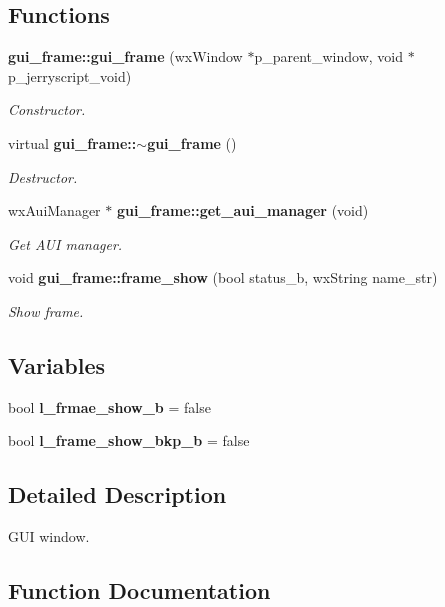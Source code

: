 \subsection*{Functions}
\begin{DoxyCompactItemize}
\item 
\textbf{ gui\+\_\+frame\+::gui\+\_\+frame} (wx\+Window $\ast$p\+\_\+parent\+\_\+window, void $\ast$p\+\_\+jerryscript\+\_\+void)
\begin{DoxyCompactList}\small\item\em Constructor. \end{DoxyCompactList}\item 
virtual \textbf{ gui\+\_\+frame\+::$\sim$gui\+\_\+frame} ()
\begin{DoxyCompactList}\small\item\em Destructor. \end{DoxyCompactList}\item 
wx\+Aui\+Manager $\ast$ \textbf{ gui\+\_\+frame\+::get\+\_\+aui\+\_\+manager} (void)
\begin{DoxyCompactList}\small\item\em Get A\+UI manager. \end{DoxyCompactList}\item 
void \textbf{ gui\+\_\+frame\+::frame\+\_\+show} (bool status\+\_\+b, wx\+String name\+\_\+str)
\begin{DoxyCompactList}\small\item\em Show frame. \end{DoxyCompactList}\end{DoxyCompactItemize}
\subsection*{Variables}
\begin{DoxyCompactItemize}
\item 
bool \textbf{ l\+\_\+frmae\+\_\+show\+\_\+b} = false
\item 
\mbox{\label{group___g_u_i_ga3cc19a2072731606e8ffd6e87a18e4ce}} 
bool {\bfseries l\+\_\+frame\+\_\+show\+\_\+bkp\+\_\+b} = false
\end{DoxyCompactItemize}


\subsection{Detailed Description}
G\+UI window. 



\subsection{Function Documentation}
\mbox{\label{group___g_u_i_ga97696df6f8b82f742725698828542476}} 
